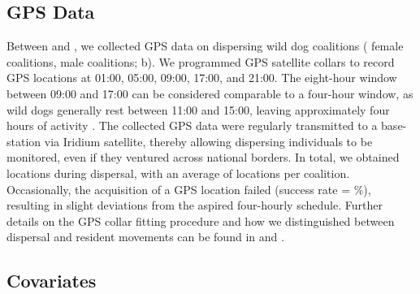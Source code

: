 \documentclass[../FinalThesis.tex]{subfiles}
\begin{document}
\subsection{GPS Data}

Between  and
, we collected GPS data on
 dispersing wild dog coalitions
( female coalitions,
 male coalitions; b). We
programmed GPS satellite collars to record GPS locations at 01:00, 05:00, 09:00,
17:00, and 21:00. The eight-hour window between 09:00 and 17:00 can be
considered comparable to a four-hour window, as wild dogs generally rest between
11:00 and 15:00, leaving approximately four hours of activity
\citep{Hayward.2009}. The collected GPS data were regularly transmitted to a
base-station via Iridium satellite, thereby allowing dispersing individuals to
be monitored, even if they ventured across national borders. In total, we
obtained  locations during dispersal, with an
average of  locations per coalition.
Occasionally, the acquisition of a GPS location failed (success rate =
\%), resulting in slight deviations from
the aspired four-hourly schedule. Further details on the GPS collar fitting
procedure and how we distinguished between dispersal and resident movements can
be found in \citet{Cozzi.2020} and \citet{Hofmann.2021}.

\subsection{Covariates}
\end{document}
